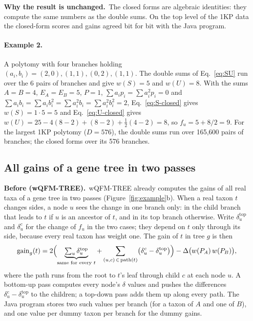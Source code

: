 \documentclass[11pt,a4paper]{article}
\newcommand{\wqfmtree}{wQFM-TREE}
\newcommand{\Before}{\par\smallskip\noindent\textbf{\textcolor{beforec}{Before (\wqfmtree).}}\ }
\newcommand{\Exact}{\par\smallskip\noindent\textbf{Why the result is unchanged.}\ }
\begin{document}
\Exact The closed forms are algebraic identities: they compute the same numbers as the double
sums. On the top level of the 1KP data the closed-form scores and gains agreed bit for bit with the
Java program.

\paragraph{Example 2.} A polytomy with four branches holding $(a_i,b_i)=(2,0),(1,1),(0,2),(1,1)$.
The double sums of Eq.~\eqref{eq:SU} run over the $6$ pairs of branches and give $w(S)=5$ and
$w(U)=8$. With the sums $A=B=4$, $E_A=E_B=5$, $P=1$, $\sum a_ip_i=\sum a_i^2p_i=0$
and $\sum a_ib_i=\sum a_ib_i^2=\sum a_i^2b_i=\sum a_i^2b_i^2=2$, Eq.~\eqref{eq:S-closed} gives
$w(S)=1\cdot5=5$ and Eq.~\eqref{eq:U-closed} gives $w(U)=25-4(8-2)+(8-2)+\tfrac12(4-2)=8$, so
$f_u=5+8/2=9$. For the largest 1KP polytomy ($D=576$), the double sums run over 165{,}600 pairs of
branches; the closed forms over its 576 branches.

\subsection{All gains of a gene tree in two passes}\label{sec:gains}

\Before \wqfmtree{} already computes the gains of all real taxa of a gene tree in two passes
(Figure~\ref{fig:example}b). When a real taxon $t$ changes sides, a node $u$ sees the change in one
branch only: in the child branch that leads to $t$ if $u$ is an ancestor of $t$, and in its top
branch otherwise. Write $\delta^{\mathrm{top}}_u$ and $\delta^c_u$ for the change of $f_u$ in the
two cases; they depend on $t$ only through its side, because every real taxon has weight one. The
gain of $t$ in tree $g$ is then
\begin{equation}\label{eq:gain}
  \mathrm{gain}_g(t) = 2\Bigl(\underbrace{\textstyle\sum_{u}\delta^{\mathrm{top}}_u}_{\text{same for every } t}
     + \sum_{(u,c)\,\in\,\mathrm{path}(t)}\bigl(\delta^{c}_u-\delta^{\mathrm{top}}_u\bigr)\Bigr)
     - \Delta\bigl(w(P_A)\,w(P_B)\bigr),
\end{equation}
where the path runs from the root to $t$'s leaf through child $c$ at each node $u$. A bottom-up pass
computes every node's $\delta$ values and pushes the differences
$\delta^c_u-\delta^{\mathrm{top}}_u$ to the children; a top-down pass adds them up along every path.
The Java program stores two such values per branch (for a taxon of $A$ and one of $B$), and one
value per dummy taxon per branch for the dummy gains.
\end{document}
